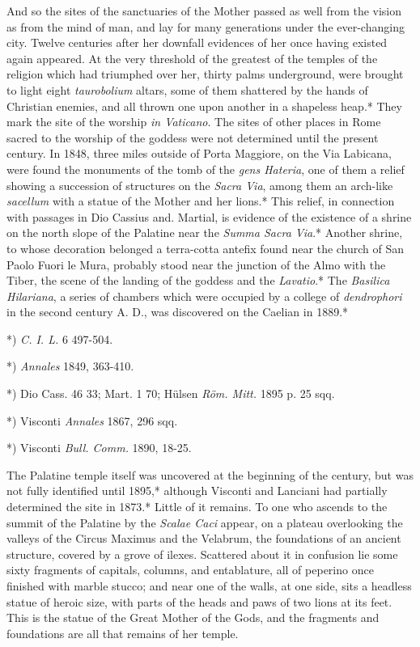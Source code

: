 \documentclass[a4paper, 11pt, oneside, polutonikogreek, english]{article}
\begin{document}
And so the sites of the sanctuaries of the Mother passed as well from the vision as from the mind of man, and lay for many generations under the ever-changing city. Twelve centuries after her downfall evidences of her once having existed again appeared. At the very threshold of the greatest of the temples of the religion which had triumphed over her, thirty palms underground, were brought to light eight \emph{taurobolium} altars, some of them shattered by the hands of Christian enemies, and all thrown one upon another in a shapeless heap.* They mark the site of the worship \emph{in Vaticano}. The sites of other places in Rome sacred to the worship of the goddess were not determined until the present century. In 1848, three miles outside of Porta Maggiore, on the Via Labicana, were found the monuments of the tomb of the \emph{gens Hateria}, one of them a relief showing a succession of structures on the \emph{Sacra Via}, among them an arch-like \emph{sacellum} with a statue of the Mother and her lions.* This relief, in connection with passages in Dio Cassius and. Martial, is evidence of the existence of a shrine on the north slope of the Palatine near the \emph{Summa Sacra Via}.* Another shrine, to whose decoration belonged a terra-cotta antefix found near the church of San Paolo Fuori le Mura, probably stood near the junction of the Almo with the Tiber, the scene of the landing of the goddess and the \emph{Lavatio}.* The \emph{Basilica Hilariana}, a series of chambers which were occupied by a college of \emph{dendrophori} in the second century A. D., was discovered on the Caelian in 1889.*

*) \emph{C. I. L.} 6 497-504.

*) \emph{Annales} 1849, 363-410.

*) Dio Cass. 46 33; Mart. 1 70; Hülsen \emph{Röm. Mitt.} 1895 p. 25 sqq.

*) Visconti \emph{Annales} 1867, 296 sqq.

*) Visconti \emph{Bull. Comm.} 1890, 18-25.

The Palatine temple itself was uncovered at the beginning of the century, but was not fully identified until 1895,* although Visconti and Lanciani had partially determined the site in 1873.* Little of it remains. To one who ascends to the summit of the Palatine by the \emph{Scalae Caci} appear, on a plateau overlooking the valleys of the Circus Maximus and the Velabrum, the foundations of an ancient structure, covered by a grove of ilexes. Scattered about it in confusion lie some sixty fragments of capitals, columns, and entablature, all of peperino once finished with marble stucco; and near one of the walls, at one side, sits a headless statue of heroic size, with parts of the heads and paws of two lions at its feet. This is the statue of the Great Mother of the Gods, and the fragments and foundations are all that remains of her temple.
\end{document}

